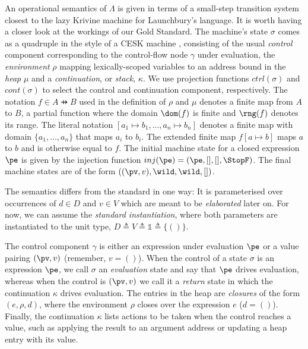 An operational semantics of $Λ$ is given in terms of a small-step transition
system closest to the lazy Krivine machine \cite{AgerDanvyMidtgaard:04} for
Launchbury's language.
It is worth having a closer look at the workings of our Gold Standard.
The machine's state $σ$ comes as a quadruple in the style of a CESK machine
\cite{Felleisen:87}, consisting of the usual \emph{control} component
corresponding to the control-flow node $γ$ under evaluation, the
\emph{environment} $ρ$ mapping lexically-scoped variables to an address bound in
the \emph{heap} $μ$ and a \emph{continuation}, or \emph{stack}, $κ$.
We use projection functions $ctrl(σ)$ and $cont(σ)$ to select the control and
continuation component, respectively.
The notation $f ∈ A \pfun B$ used in the definition of $ρ$ and $μ$ denotes a
finite map from $A$ to $B$, a partial function where the domain $\dom(f)$ is
finite and $\rng(f)$ denotes its range.
The literal notation $[a_1↦b_1,...,a_n↦b_n]$ denotes a finite map with domain
$\{a_1,...,a_n\}$ that maps $a_i$ to $b_i$. The extended finite map $f[a ↦ b]$
maps $a$ to $b$ and is otherwise equal to $f$.
The initial machine state for a closed expression $\pe$ is given by the
injection function $inj(\pe) = (\pe,[],[],\StopF)$.
The final machine states are of the form $((\pv,v),\wild,\wild,[])$.

The semantics differs from the standard in one way: It is parameterised over
occurrences of $d ∈ D$ and $v ∈ V$ which are meant to be \emph{elaborated} later
on. For now, we can assume the \emph{standard instantiation}, where both
parameters are instantiated to the unit type, $D \triangleq V \triangleq
\mathbb{1} \triangleq \{ () \}$.

The control component $γ$ is either an expression under evaluation $\pe$ or a
value pairing $(\pv,v)$ (remember, $v = ()$).
When the control of a state $σ$ is an expression $\pe$, we call $σ$ an
\emph{evaluation} state and say that $\pe$ drives evaluation, whereas when the
control is $(\pv, v)$ we call it a \emph{return} state in which the continuation
$κ$ drives evaluation.
The entries in the heap are \emph{closures} of the form $(e,ρ,d)$, where the
environment $ρ$ closes over the expression $e$ ($d = ()$).
Finally, the continuation $κ$ lists actions to be taken when the control reaches
a value, such as applying the result to an argument address or updating a heap
entry with its value.

